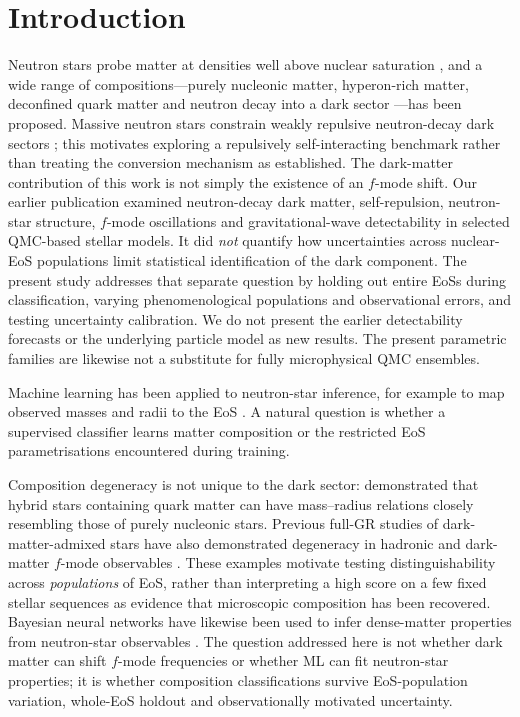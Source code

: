 \documentclass[11pt,a4paper]{article}
\begin{document}
\section{Introduction}
Neutron stars probe matter at densities well above nuclear saturation \citep{LP04,OF16}, and a wide range of compositions---purely nucleonic matter, hyperon-rich matter, deconfined quark matter and neutron decay into a dark sector \citep{Husain22}---has been proposed.
Massive neutron stars constrain weakly repulsive neutron-decay dark sectors \citep{McKeen18,Baym18,Motta18}; this motivates exploring a repulsively self-interacting benchmark rather than treating the conversion mechanism as established. The dark-matter contribution of this work is not simply the existence of an $f$-mode shift. Our earlier publication \citep{HusainOsc} examined neutron-decay dark matter, self-repulsion, neutron-star structure, $f$-mode oscillations and gravitational-wave detectability in selected QMC-based stellar models. It did \emph{not} quantify how uncertainties across nuclear-EoS populations limit statistical identification of the dark component. The present study addresses that separate question by holding out entire EoSs during classification, varying phenomenological populations and observational errors, and testing uncertainty calibration. We do not present the earlier detectability forecasts or the underlying particle model as new results. The present parametric families are likewise not a substitute for fully microphysical QMC ensembles.

Machine learning has been applied to neutron-star inference, for example to map observed masses and radii to the EoS \citep{Fujimoto18}. A natural question is whether a supervised classifier learns matter composition or the restricted EoS parametrisations encountered during training.

Composition degeneracy is not unique to the dark sector: \citet{Alford05} demonstrated that hybrid stars containing quark matter can have mass--radius relations closely resembling those of purely nucleonic stars. Previous full-GR studies of dark-matter-admixed stars have also demonstrated degeneracy in hadronic and dark-matter $f$-mode observables \citep{Shirke24}. These examples motivate testing distinguishability across \emph{populations} of EoS, rather than interpreting a high score on a few fixed stellar sequences as evidence that microscopic composition has been recovered. Bayesian neural networks have likewise been used to infer dense-matter properties from neutron-star observables \citep{Carvalho23}. The question addressed here is not whether dark matter can shift $f$-mode frequencies or whether ML can fit neutron-star properties; it is whether composition classifications survive EoS-population variation, whole-EoS holdout and observationally motivated uncertainty.
\end{document}
